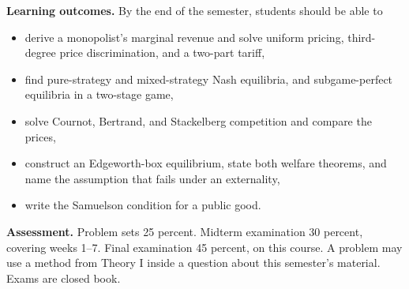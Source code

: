 \documentclass[11pt]{article}
\begin{document}
\textbf{Learning outcomes.}
By the end of the semester, students should be able to
\begin{itemize}
\item derive a monopolist's marginal revenue and solve uniform pricing, third-degree price discrimination, and a two-part tariff,
\item find pure-strategy and mixed-strategy Nash equilibria, and subgame-perfect equilibria in a two-stage game,
\item solve Cournot, Bertrand, and Stackelberg competition and compare the prices,
\item construct an Edgeworth-box equilibrium, state both welfare theorems, and name the assumption that fails under an externality,
\item write the Samuelson condition for a public good.
\end{itemize}

\textbf{Assessment.}
Problem sets 25 percent. Midterm examination 30 percent, covering weeks 1--7. Final examination 45 percent, on this course. A problem may use a method from Theory I inside a question about this semester's material. Exams are closed book.
\end{document}
